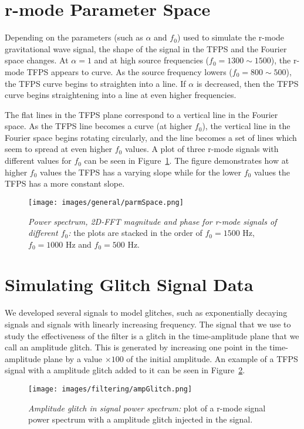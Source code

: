 \documentclass[%
reprint,
amsmath,amssymb,
aps,
]{revtex4-1}
\begin{document}
	\section{r-mode Parameter Space}
	Depending on the parameters (such as $\alpha$ and $f_0$) used to simulate the r-mode gravitational wave signal, the shape of the signal in the TFPS and the Fourier space changes. At $\alpha = 1$ and at high source frequencies ($f_0 = 1300\sim1500$), the r-mode TFPS appears to curve. As the source frequency lowers ($f_0 = 800\sim500$), the TFPS curve begins to straighten into a line. If $\alpha$ is decreased, then the TFPS curve begins straightening into a line at even higher frequencies. 
	
	The flat lines in the TFPS plane correspond to a vertical line in the Fourier space. As the TFPS line becomes a curve (at higher $f_0$), the vertical line in the Fourier space begins rotating circularly, and the line becomes a set of lines which seem to spread at even higher $f_0$ values.
	A plot of three r-mode signals with different values for $f_0$ can be seen in Figure~\ref{fig:paramSpace}. The figure demonstrates how at higher $f_0$ values the TFPS has a varying slope while for the lower $f_0$ values the TFPS has a more constant slope.
	
	
	
	\begin{figure}[h]
		\centering
		\texttt{[image: images/general/parmSpace.png]}
		\caption{\textit{Power spectrum, 2D-FFT magnitude and phase for r-mode signals of different $f_0$:} the plots are stacked in the order of $f_0 = 1500$ Hz, $f_0 = 1000$ Hz and $f_0 = 500$ Hz.}
		\label{fig:paramSpace}
	\end{figure}
	
	
	\section{Simulating Glitch Signal Data}
	We developed several signals to model glitches, such as exponentially decaying signals and signals with linearly increasing frequency. The signal that we use to study the effectiveness of the filter is a glitch in the time-amplitude plane that we call an amplitude glitch. This is generated by increasing one point in the time-amplitude plane by a value $\times100$ of the initial amplitude. An example of a TFPS signal with a amplitude glitch added to it can be seen in Figure~\ref{fig:glitch}.
	
	\begin{figure}[h]
		\centering
		\texttt{[image: images/filtering/ampGlitch.png]}
		\caption{\textit{Amplitude glitch in signal power spectrum:} plot of a r-mode signal power spectrum with a amplitude glitch injected in the signal.}
		\label{fig:glitch}
	\end{figure}
	
\end{document}

